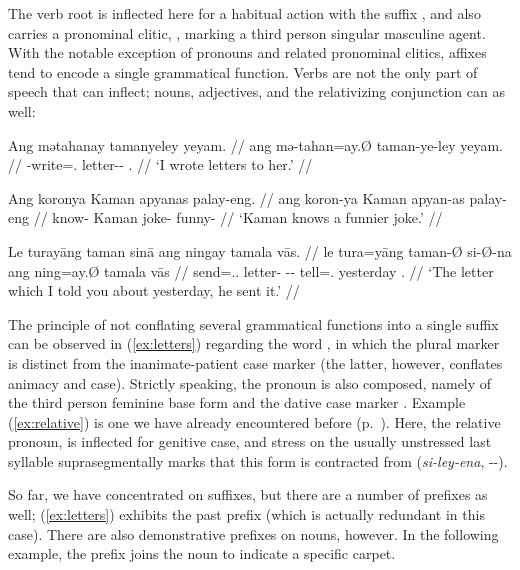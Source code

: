 The verb root  is inflected here for a habitual action
with the suffix , and also carries a pronominal
clitic, , marking a third person singular
masculine agent. With the notable exception of pronouns and related pronominal
clitics, affixes tend to encode a single grammatical function. Verbs are not
the only part of speech that can inflect; nouns, adjectives, and the
relativizing conjunction can as well:

\pex
\a\label{ex:letters}\begingl
	\gla Ang mətahanay tamanyeley yeyam. //
	\glb ang mə-tahan=ay.Ø taman-ye-ley yeyam. //
	\glc \AgtT{} \Pst{}-write=\Fsg{}.\Top{} letter-\Pl{}-\PargI{} 
		\TsgF{}.\Dat{} //
	\glft `I wrote letters to her.' //
\endgl

\a\label{ex:adjinfl}\begingl
	\gla Ang koronya Kaman apyanas palay-eng. //
	\glb ang koron-ya Kaman apyan-as palay-eng //
	\glc \AgtT{} know-\TsgM{} Kaman joke-\Parg{} funny-\Comp{} //
	\glft `Kaman knows a funnier joke.' //
\endgl

\a\label{ex:relative}\begingl
	\gla Le turayāng taman sinā ang ningay tamala vās. //
	\glb le tura=yāng taman-Ø si-Ø-na ang ning=ay.Ø tamala vās //
	\glc \PatTI{} send=\Tsg{}.\M{}.\Aarg{} letter-\Top{} 
		\Rel{}-\PatTI{}-\Gen{} \AgtT{} tell=\Fsg{}.\Top{} yesterday 
		\Ssg{}.\Parg{} //
	\glft `The letter which I told you about yesterday, he sent it.' //
\endgl
\xe

The principle of not conflating several grammatical functions into a single
suffix can be observed in (\ref{ex:letters}) regarding the word
, in which the plural marker 
 is distinct from the inanimate-patient case marker 
 (the latter, however, conflates animacy and case). Strictly 
speaking, the pronoun  is also composed, namely of
the third person feminine base form  and the dative case marker
. Example (\ref{ex:relative}) is one we have already 
encountered before (p.~\pageref{doublerel}). Here, the relative pronoun,
 is inflected for genitive case, and 
stress on the usually unstressed last syllable
suprasegmentally marks that this form is contracted from
 (\textit{si-ley-ena}, \Rel{}-\PargI{}-\Gen{}).

So far, we have concentrated on suffixes, but there are a number of 
prefixes as well; (\ref{ex:letters}) exhibits the past prefix 
 (which is actually redundant in this case). There are also 
demonstrative prefixes on nouns, however. In the following example, the prefix 
 joins the noun  to indicate 
a specific carpet.

